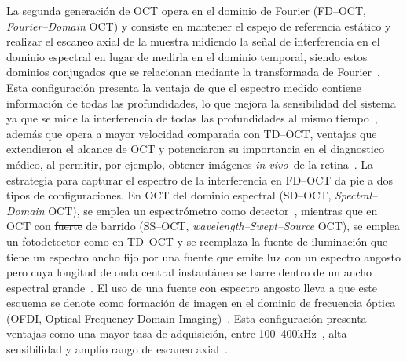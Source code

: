 \documentclass[letter, 12 pt]{article}
\newcommand{\invi}{\textit{in vivo}\ }
\providecommand{\DIFaddtex}[1]{{\protect\color{blue}\uwave{#1}}} %
\providecommand{\DIFdeltex}[1]{{\protect\color{red}\sout{#1}}}                      %
\providecommand{\DIFaddbegin}{} %
\providecommand{\DIFaddend}{} %
\providecommand{\DIFdelbegin}{} %
\providecommand{\DIFdelend}{} %
\providecommand{\DIFadd}[1]{\texorpdfstring{\DIFaddtex{#1}}{#1}} %
\providecommand{\DIFdel}[1]{\texorpdfstring{\DIFdeltex{#1}}{}} %
\newcommand{\DIFscaledelfig}{0.5}
\newlength{\DIFdelgraphicswidth} %
\newlength{\DIFdelgraphicsheight} %
\newcommand{\DIFaddincludegraphics}[2][]{{\color{blue}\fbox{\DIFOincludegraphics[#1]{#2}}}} %
\newcommand{\DIFdelincludegraphics}[2][]{%
\sbox{\DIFdelgraphicsbox}{\DIFOincludegraphics[#1]{#2}}%
\settoboxwidth{\DIFdelgraphicswidth}{\DIFdelgraphicsbox} %
\settoboxtotalheight{\DIFdelgraphicsheight}{\DIFdelgraphicsbox} %
\scalebox{\DIFscaledelfig}{%
\parbox[b]{\DIFdelgraphicswidth}{\usebox{\DIFdelgraphicsbox}\\[-\baselineskip] \rule{\DIFdelgraphicswidth}{0em}}\llap{\resizebox{\DIFdelgraphicswidth}{\DIFdelgraphicsheight}{%
\setlength{\unitlength}{\DIFdelgraphicswidth}%
\begin{picture}(1,1)%
\thicklines\linethickness{2pt} %
{\color[rgb]{1,0,0}\put(0,0){\framebox(1,1){}}}%
{\color[rgb]{1,0,0}\put(0,0){\line( 1,1){1}}}%
{\color[rgb]{1,0,0}\put(0,1){\line(1,-1){1}}}%
\end{picture}%
}\hspace*{3pt}}} %
} %
\DeclareRobustCommand{\DIFaddbegin}{\DIFOaddbegin \let\includegraphics\DIFaddincludegraphics} %
\DeclareRobustCommand{\DIFaddend}{\DIFOaddend \let\includegraphics\DIFOincludegraphics} %
\DeclareRobustCommand{\DIFdelbegin}{\DIFOdelbegin \let\includegraphics\DIFdelincludegraphics} %
\DeclareRobustCommand{\DIFdelend}{\DIFOaddend \let\includegraphics\DIFOincludegraphics} %
\begin{document}
La segunda generación de OCT opera en el dominio de Fourier (FD--OCT, \textit{Fourier--Domain} OCT) y consiste en mantener el espejo de referencia estático y realizar el escaneo axial de la muestra midiendo la señal de interferencia en el dominio espectral en lugar de medirla en el dominio temporal, siendo estos dominios conjugados que se relacionan mediante la transformada de Fourier~\cite{Fercher1995_Measurement}. Esta configuración presenta la ventaja de que el espectro medido contiene información de todas las profundidades, lo que mejora la sensibilidad del sistema ya que se mide la interferencia de todas las profundidades al mismo tiempo~\cite{Leitgeb2003_Performance}, además que opera a mayor velocidad comparada con TD--OCT, ventajas que extendieron el alcance de OCT y potenciaron su importancia en el diagnostico médico, al permitir, por ejemplo, obtener imágenes \invi de la retina~\cite{Nassif2004_Vivo}. La estrategia para capturar el espectro de la interferencia en FD--OCT da pie a dos tipos de configuraciones. En OCT del dominio espectral (SD--OCT, \textit{Spectral--Domain} OCT), se emplea un espectrómetro como detector~\cite{Fercher1995_Measurement}, mientras que en OCT con \DIFdelbegin \DIFdel{fuerte }\DIFdelend \DIFaddbegin \DIFadd{fuente }\DIFaddend de barrido (SS--OCT, \textit{wavelength--Swept--Source} OCT), se emplea un fotodetector como en TD--OCT y se reemplaza la fuente de iluminación que tiene un espectro ancho fijo por una fuente que emite luz con un espectro angosto pero cuya longitud de onda central instantánea se barre dentro de un ancho espectral grande~\cite{Chinn1997_Optical}. El uso de una fuente con espectro angosto lleva a que este esquema se denote como formación de imagen en el dominio de frecuencia óptica (OFDI, Optical Frequency Domain Imaging)~\cite{Yun2003_High}. Esta configuración presenta ventajas como una mayor tasa de adquisición, entre 100--400kHz~\cite{Oh2010_400}, alta sensibilidad y amplio rango de escaneo axial~\cite{Choma2003_Sensitivity}. \\
\end{document}
